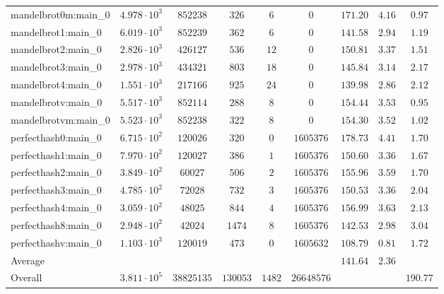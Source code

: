 \begin{tabular}{|l|c|c|c|c|c|c|c|c|}
mandelbrot0m:main\_0           & $ 4.978 \cdot 10^{3} $ & $ 852238   $ & $ 326    $ & $ 6    $ & $ 0        $ & $ 171.20      $ & $ 4.16    $ & $ 0.97    $ \\
mandelbrot1:main\_0            & $ 6.019 \cdot 10^{3} $ & $ 852239   $ & $ 362    $ & $ 6    $ & $ 0        $ & $ 141.58      $ & $ 2.94    $ & $ 1.19    $ \\
mandelbrot2:main\_0            & $ 2.826 \cdot 10^{3} $ & $ 426127   $ & $ 536    $ & $ 12   $ & $ 0        $ & $ 150.81      $ & $ 3.37    $ & $ 1.51    $ \\
mandelbrot3:main\_0            & $ 2.978 \cdot 10^{3} $ & $ 434321   $ & $ 803    $ & $ 18   $ & $ 0        $ & $ 145.84      $ & $ 3.14    $ & $ 2.17    $ \\
mandelbrot4:main\_0            & $ 1.551 \cdot 10^{3} $ & $ 217166   $ & $ 925    $ & $ 24   $ & $ 0        $ & $ 139.98      $ & $ 2.86    $ & $ 2.12    $ \\
mandelbrotv:main\_0            & $ 5.517 \cdot 10^{3} $ & $ 852114   $ & $ 288    $ & $ 8    $ & $ 0        $ & $ 154.44      $ & $ 3.53    $ & $ 0.95    $ \\
mandelbrotvm:main\_0           & $ 5.523 \cdot 10^{3} $ & $ 852238   $ & $ 322    $ & $ 8    $ & $ 0        $ & $ 154.30      $ & $ 3.52    $ & $ 1.02    $ \\
perfecthash0:main\_0           & $ 6.715 \cdot 10^{2} $ & $ 120026   $ & $ 320    $ & $ 0    $ & $ 1605376  $ & $ 178.73      $ & $ 4.41    $ & $ 1.70    $ \\
perfecthash1:main\_0           & $ 7.970 \cdot 10^{2} $ & $ 120027   $ & $ 386    $ & $ 1    $ & $ 1605376  $ & $ 150.60      $ & $ 3.36    $ & $ 1.67    $ \\
perfecthash2:main\_0           & $ 3.849 \cdot 10^{2} $ & $ 60027    $ & $ 506    $ & $ 2    $ & $ 1605376  $ & $ 155.96      $ & $ 3.59    $ & $ 1.70    $ \\
perfecthash3:main\_0           & $ 4.785 \cdot 10^{2} $ & $ 72028    $ & $ 732    $ & $ 3    $ & $ 1605376  $ & $ 150.53      $ & $ 3.36    $ & $ 2.04    $ \\
perfecthash4:main\_0           & $ 3.059 \cdot 10^{2} $ & $ 48025    $ & $ 844    $ & $ 4    $ & $ 1605376  $ & $ 156.99      $ & $ 3.63    $ & $ 2.13    $ \\
perfecthash8:main\_0           & $ 2.948 \cdot 10^{2} $ & $ 42024    $ & $ 1474   $ & $ 8    $ & $ 1605376  $ & $ 142.53      $ & $ 2.98    $ & $ 3.04    $ \\
perfecthashv:main\_0           & $ 1.103 \cdot 10^{3} $ & $ 120019   $ & $ 473    $ & $ 0    $ & $ 1605632  $ & $ 108.79      $ & $ 0.81    $ & $ 1.72    $ \\
\hline
Average                        & $                    $ & $          $ & $        $ & $      $ & $          $ & $ 141.64      $ & $ 2.36    $ & $         $ \\
\hline
Overall                        & $ 3.811 \cdot 10^{5} $ & $ 38825135 $ & $ 130053 $ & $ 1482 $ & $ 26648576 $ & $             $ & $         $ & $ 190.77  $ \\
\hline
\end{tabular}
